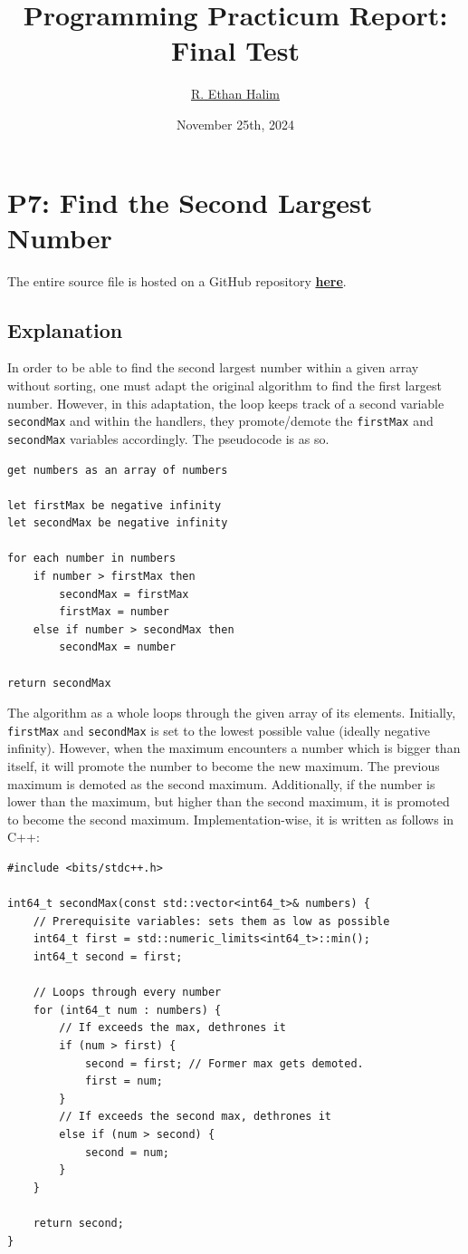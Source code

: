 \documentclass[12pt]{article}
\title{Programming Practicum Report:\\Final Test}
\author{\href{https://github.com/avaxar}{R. Ethan Halim}}
\date{November 25th, 2024}
\begin{document}
\maketitle

\section{P7: Find the Second Largest Number}
The entire source file is hosted on a GitHub repository \href{https://github.com/avaxar/uni-practica-1/tree/main/finals/01_second_max}{\textbf{here}}.

\subsection{Explanation}

In order to be able to find the second largest number within a given array without sorting, one must adapt the original algorithm to find the first largest number. However, in this adaptation, the loop keeps track of a second variable \texttt{secondMax} and within the handlers, they promote/demote the \texttt{firstMax} and \texttt{secondMax} variables accordingly. The pseudocode is as so.

\begin{verbatim}
get numbers as an array of numbers

let firstMax be negative infinity
let secondMax be negative infinity

for each number in numbers
    if number > firstMax then
        secondMax = firstMax
        firstMax = number
    else if number > secondMax then
        secondMax = number

return secondMax
\end{verbatim}

The algorithm as a whole loops through the given array of its elements. Initially, \texttt{firstMax} and \texttt{secondMax} is set to the lowest possible value (ideally negative infinity). However, when the maximum encounters a number which is bigger than itself, it will promote the number to become the new maximum. The previous maximum is demoted as the second maximum. Additionally, if the number is lower than the maximum, but higher than the second maximum, it is promoted to become the second maximum. Implementation-wise, it is written as follows in C++:

\begin{verbatim}
#include <bits/stdc++.h>

int64_t secondMax(const std::vector<int64_t>& numbers) {
    // Prerequisite variables: sets them as low as possible
    int64_t first = std::numeric_limits<int64_t>::min();
    int64_t second = first;

    // Loops through every number
    for (int64_t num : numbers) {
        // If exceeds the max, dethrones it
        if (num > first) {
            second = first; // Former max gets demoted.
            first = num;
        }
        // If exceeds the second max, dethrones it
        else if (num > second) {
            second = num;
        }
    }

    return second;
}
\end{verbatim}
\end{document}
